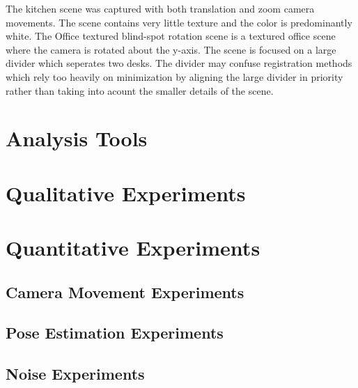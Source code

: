 The kitchen scene was captured with both translation and zoom camera movements. The scene contains very little texture and the color is predominantly white. The Office textured blind-spot rotation scene is a textured office scene where the camera is rotated about the y-axis. The scene is focused on a large divider which seperates two desks. The divider may confuse registration methods which rely too heavily on minimization by aligning the large divider in priority rather than taking into acount the smaller details of the scene.

\section{Analysis Tools}

\section{Qualitative Experiments}

\section{Quantitative Experiments}

\subsection{Camera Movement Experiments}

\subsection{Pose Estimation Experiments}

\subsection{Noise Experiments}




